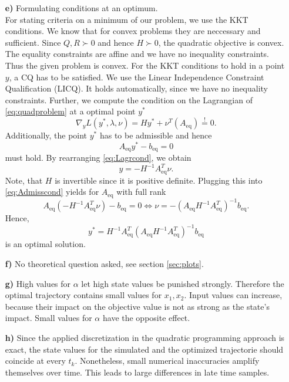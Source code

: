 \documentclass[]{article}
\newcommand{\yopt}{y^*}
\newcommand{\todo}{{\color{red} TODO!}}
\newcommand{\ind}[2]{{#1}_{\mathrm{#2}}}
\newcommand{\trp}{^T}
\newcommand{\xone}{x_1}
\newcommand{\xtwo}{x_2}
\newcommand{\Aeq}{\ind{A}{eq}}
\newcommand{\beq}{\ind{b}{eq}}
\newcommand{\grad}{\nabla}
\newcommand{\inv}{^{-1}}
\begin{document}
\begin{enumerate}
\item[\bf e)] Formulating  conditions at an optimum.\\
For stating criteria on a minimum of our problem, we use the KKT conditions.
We know that for convex problems they are neccessary and sufficient. Since $ Q,R \succ 0$ and hence $ H \succ 0 $, the quadratic objective is convex. The equality constraints are affine and we have no inequality constraints. Thus the given problem is convex. For the KKT conditions to hold in a point $ y$, a CQ has to be satisfied. We use the Linear Independence Constraint Qualification (LICQ).
It holds automatically, since we have no inequality constraints. 
Further, we compute the condition on the Lagrangian of \eqref{eq:quadproblem} at a optimal point $ \yopt $
\begin{equation}
	\grad_y	L(\yopt,\lambda,\nu) = H\yopt + \nu \trp (\Aeq) \overset{!}{=} 0. \label{eq:Lagrcond}
\end{equation}
Additionally, the point $ \yopt $ has to be admissible and hence \begin{equation}
	\Aeq \yopt - \beq = 0 \label{eq:Admisscond}
\end{equation}
must hold.
By rearranging \eqref{eq:Lagrcond}, we obtain
\[ y = - H\inv\Aeq \trp \nu. \]
Note, that $ H $ is invertible since it is positive definite.
Plugging this into \eqref{eq:Admisscond} yields for $ \Aeq $ with full rank
\[  \Aeq (-H\inv \Aeq \trp \nu) -\beq = 0 \Longleftrightarrow \nu = -(\Aeq H\inv \Aeq\trp)\inv \beq.\]
Hence, \[ \yopt = H\inv \Aeq\trp (\Aeq H\inv \Aeq\trp)\inv \beq \] is an optimal solution.\\


\item[\bf f)] No theoretical question asked, see section \ref{sec:plots}.
\item[\bf g)] High values for $ \alpha $ let high state values be punished strongly. Therefore the optimal trajectory contains small values for $ \xone,\xtwo $.  Input values can increase, because their impact on the objective value is not as strong as the state's impact. Small values for $ \alpha $ have the opposite effect. 

\item[\bf h)] Since the applied discretization in the quadratic programming approach is exact, the state values for the simulated and the optimized trajectorie should coincide at every $ t_k $. Nonetheless, small numerical inaccuracies amplify themselves over time. This leads to large differences in late time samples.
\end{enumerate}
\end{document}
